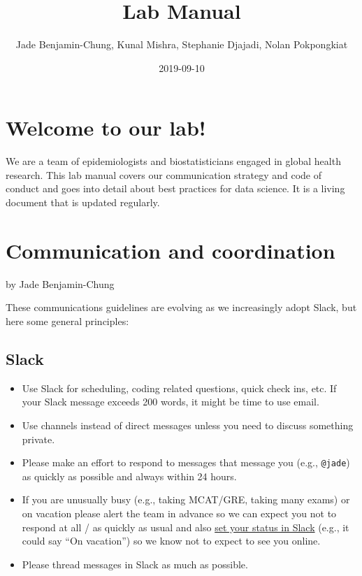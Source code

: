 \documentclass[]{book}
\title{Lab Manual}
\author{Jade Benjamin-Chung, Kunal Mishra, Stephanie Djajadi, Nolan Pokpongkiat}
\date{2019-09-10}
\providecommand{\tightlist}{%
  \setlength{\itemsep}{0pt}\setlength{\parskip}{0pt}}
\begin{document}
\maketitle

{
\setcounter{tocdepth}{1}
\tableofcontents
}
\hypertarget{welcome-to-our-lab}{%
\chapter{Welcome to our lab!}\label{welcome-to-our-lab}}

We are a team of epidemiologists and biostatisticians engaged in global health research. This lab manual covers our communication strategy and code of conduct and goes into detail about best practices for data science. It is a living document that is updated regularly.

\hypertarget{communication-and-coordination}{%
\chapter{Communication and coordination}\label{communication-and-coordination}}

by Jade Benjamin-Chung

These communications guidelines are evolving as we increasingly adopt Slack, but here some general principles:

\hypertarget{slack}{%
\section{Slack}\label{slack}}

\begin{itemize}
\tightlist
\item
  Use Slack for scheduling, coding related questions, quick check ins, etc. If your Slack message exceeds 200 words, it might be time to use email.
\item
  Use channels instead of direct messages unless you need to discuss something private.
\item
  Please make an effort to respond to messages that message you (e.g., \texttt{@jade}) as quickly as possible and always within 24 hours.
\item
  If you are unusually busy (e.g., taking MCAT/GRE, taking many exams) or on vacation please alert the team in advance so we can expect you not to respond at all / as quickly as usual and also \href{https://get.slack.help/hc/en-us/articles/201864558-Set-your-Slack-status-and-availability}{set your status in Slack} (e.g., it could say ``On vacation'') so we know not to expect to see you online.
\item
  Please thread messages in Slack as much as possible.
\end{itemize}
\end{document}
